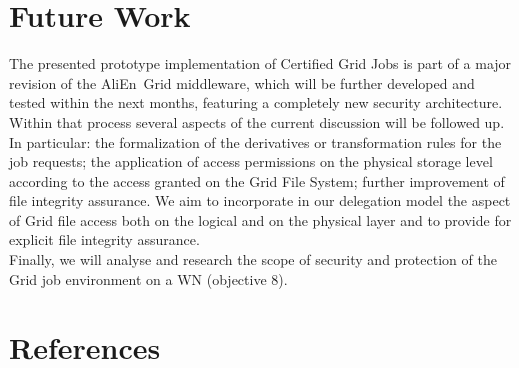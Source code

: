 \documentclass[10pt]{iopart}
\newcommand{\alien}{AliEn}
\begin{document}
\section{Future Work}
The presented prototype implementation of Certified Grid
Jobs is part of a major
revision of the \alien\ Grid middleware, which will be further developed and
tested within the next months, featuring a completely new security
architecture. Within that process several aspects of the current discussion
will be followed up.  In particular: the formalization of the derivatives or
transformation rules for the job requests; the application of access
permissions on the physical storage level according to the access
granted on the Grid File System; further improvement of file
integrity assurance. We aim to incorporate in our
delegation model the aspect of Grid file access both on the logical
and on the physical layer and to provide for explicit file integrity assurance.\\
Finally, we will analyse and research the scope of security and
protection of the Grid job environment on a WN (objective 8).






\section*{References}

\end{document}
